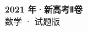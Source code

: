 \documentclass[zihao=-4, a4paper]{ctexart}
\begin{document}
\begin{center}
  {\Large\bfseries 2021 年·新高考Ⅱ卷}\\[4pt]
  {\large 数学 · 试题版}
\end{center}
\medskip
{}

\end{document}
